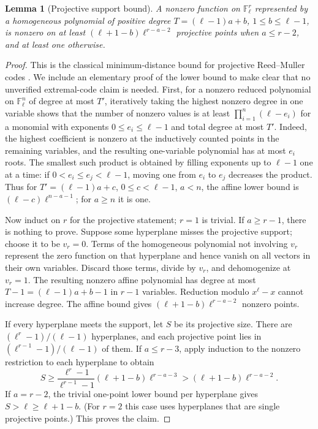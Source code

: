\documentclass[11pt]{article}
\newtheorem{lemma}[theorem]{Lemma}
\theoremstyle{remark}\newtheorem{remark}[theorem]{Remark}
\newcommand{\F}{\mathbb F}
\begin{document}
\begin{lemma}[Projective support bound]\label{lem:prm}
A nonzero function on $\F_\ell^r$ represented by a homogeneous polynomial of positive degree $T=(\ell-1)a+b$, $1\le b\le\ell-1$, is nonzero on at least $(\ell+1-b)\ell^{r-a-2}$ projective points when $a\le r-2$, and at least one otherwise.
\end{lemma}
\begin{proof}
This is the classical minimum-distance bound for projective Reed--Muller codes \cite[Corollary 3.3]{GL}. We include an elementary proof of the lower bound to make clear that no unverified extremal-code claim is needed. First, for a nonzero reduced polynomial on $\F_\ell^n$ of degree at most $T'$, iteratively taking the highest nonzero degree in one variable shows that the number of nonzero values is at least $\prod_{i=1}^n(\ell-e_i)$ for a monomial with exponents $0\le e_i\le\ell-1$ and total degree at most $T'$. Indeed, the highest coefficient is nonzero at the inductively counted points in the remaining variables, and the resulting one-variable polynomial has at most $e_i$ roots. The smallest such product is obtained by filling exponents up to $\ell-1$ one at a time: if $0<e_i\le e_j<\ell-1$, moving one from $e_i$ to $e_j$ decreases the product. Thus for $T'=(\ell-1)a+c$, $0\le c<\ell-1$, $a<n$, the affine lower bound is $(\ell-c)\ell^{n-a-1}$; for $a\ge n$ it is one.

Now induct on $r$ for the projective statement; $r=1$ is trivial. If $a\ge r-1$, there is nothing to prove. Suppose some hyperplane misses the projective support; choose it to be $v_r=0$. Terms of the homogeneous polynomial not involving $v_r$ represent the zero function on that hyperplane and hence vanish on all vectors in their own variables. Discard those terms, divide by $v_r$, and dehomogenize at $v_r=1$. The resulting nonzero affine polynomial has degree at most $T-1=(\ell-1)a+b-1$ in $r-1$ variables. Reduction modulo $x^\ell-x$ cannot increase degree. The affine bound gives $(\ell+1-b)\ell^{r-a-2}$ nonzero points.

If every hyperplane meets the support, let $S$ be its projective size. There are $(\ell^r-1)/(\ell-1)$ hyperplanes, and each projective point lies in $(\ell^{r-1}-1)/(\ell-1)$ of them. If $a\le r-3$, apply induction to the nonzero restriction to each hyperplane to obtain
\[
 S\ge\frac{\ell^r-1}{\ell^{r-1}-1}(\ell+1-b)\ell^{r-a-3}>(\ell+1-b)\ell^{r-a-2}.
\]
If $a=r-2$, the trivial one-point lower bound per hyperplane gives $S>\ell\ge\ell+1-b$. (For $r=2$ this case uses hyperplanes that are single projective points.) This proves the claim.
\end{proof}
\end{document}
